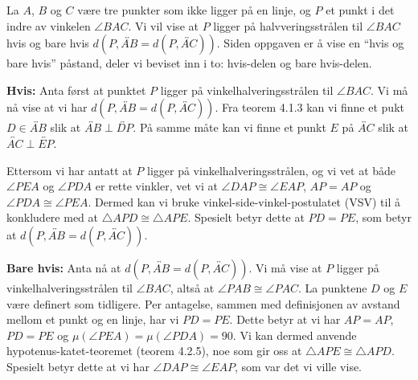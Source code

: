 \begin{oppgave}[4.3.8]
    La $A$, $B$ og $C$ være tre punkter som ikke ligger på en linje, og $P$ et punkt i det indre av vinkelen $\angle BAC$. 
    Vi vil vise at $P$ ligger på halvveringsstrålen til $\angle BAC$ hvis og bare hvis $d(P, \overleftrightarrow{AB}=d(P, \overleftrightarrow{AC}))$. 
    Siden oppgaven er å vise en ``hvis og bare hvis'' påstand, deler vi beviset inn i to: hvis-delen og bare hvis-delen. 

    \textbf{Hvis:} 
    Anta først at punktet $P$ ligger på vinkelhalveringsstrålen til $\angle BAC$. 
    Vi må nå vise at vi har $d(P, \overleftrightarrow{AB}=d(P, \overleftrightarrow{AC}))$. 
    Fra teorem 4.1.3 kan vi finne et pukt $D\in \overleftrightarrow{AB}$ slik at $\overleftrightarrow{AB}\perp \overleftrightarrow{DP}$.
    På samme måte kan vi finne et punkt $E$ på $\overleftrightarrow{AC}$ slik at $\overleftrightarrow{AC}\perp \overleftrightarrow{EP}$.

    \begin{figure}[H]
        \centering
        
    \end{figure}

    Ettersom vi har antatt at $P$ ligger på vinkelhalveringsstrålen, og vi vet at både $\angle PEA$ og $\angle PDA$ er rette vinkler, vet vi at $\angle DAP\cong \angle EAP$, $AP=AP$ og $\angle PDA\cong \angle PEA$.
    Dermed kan vi bruke vinkel-side-vinkel-postulatet (VSV) til å konkludere med at $\triangle APD\cong \triangle APE$. 
    Spesielt betyr dette at $PD=PE$, som betyr at $d(P, \overleftrightarrow{AB}=d(P, \overleftrightarrow{AC}))$. 

    \textbf{Bare hvis:} Anta nå at $d(P, \overleftrightarrow{AB}=d(P, \overleftrightarrow{AC}))$. 
    Vi må vise at $P$ ligger på vinkelhalveringsstrålen til $\angle BAC$, altså at $\angle PAB\cong \angle PAC$. 
    La punktene $D$ og $E$ være definert som tidligere. 
    Per antagelse, sammen med definisjonen av avstand mellom et punkt og en linje, har vi $PD=PE$. 
    Dette betyr at vi har $AP=AP$, $PD=PE$ og $\mu(\angle PEA)=\mu(\angle PDA)=90$. 
    Vi kan dermed anvende hypotenus-katet-teoremet (teorem 4.2.5), noe som gir oss at $\triangle APE\cong\triangle APD$. 
    Spesielt betyr dette at vi har $\angle DAP\cong \angle EAP$, som var det vi ville vise. 

\end{oppgave}
